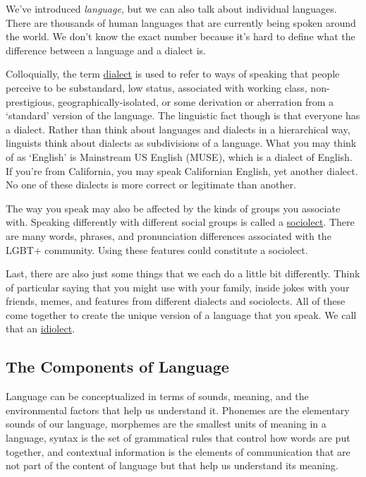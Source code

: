 \documentclass[
]{krantz}
\begin{document}
We've introduced \emph{language}, but we can also talk about individual languages. There are thousands of human languages that are currently being spoken around the world. We don't know the exact number because it's hard to define what the difference between a language and a dialect is.

Colloquially, the term \hyperref[dialect]{dialect} is used to refer to ways of speaking that people perceive to be substandard, low status, associated with working class, non-prestigious, geographically-isolated, or some derivation or aberration from a `standard' version of the language. The linguistic fact though is that everyone has a dialect. Rather than think about languages and dialects in a hierarchical way, linguists think about dialects as subdivisions of a language. What you may think of as `English' is Mainstream US English (MUSE), which is a dialect of English. If you're from California, you may speak Californian English, yet another dialect. No one of these dialects is more correct or legitimate than another.

The way you speak may also be affected by the kinds of groups you associate with. Speaking differently with different social groups is called a \hyperref[sociolect]{sociolect}. There are many words, phrases, and pronunciation differences associated with the LGBT+ community. Using these features could constitute a sociolect.

Last, there are also just some things that we each do a little bit differently. Think of particular saying that you might use with your family, inside jokes with your friends, memes, and features from different dialects and sociolects. All of these come together to create the unique version of a language that you speak. We call that an \hyperref[idiolect]{idiolect}.

\subsection*{The Components of Language}\label{the-components-of-language}


Language can be conceptualized in terms of sounds, meaning, and the environmental factors that help us understand it. Phonemes are the elementary sounds of our language, morphemes are the smallest units of meaning in a language, syntax is the set of grammatical rules that control how words are put together, and contextual information is the elements of communication that are not part of the content of language but that help us understand its meaning.
\end{document}
